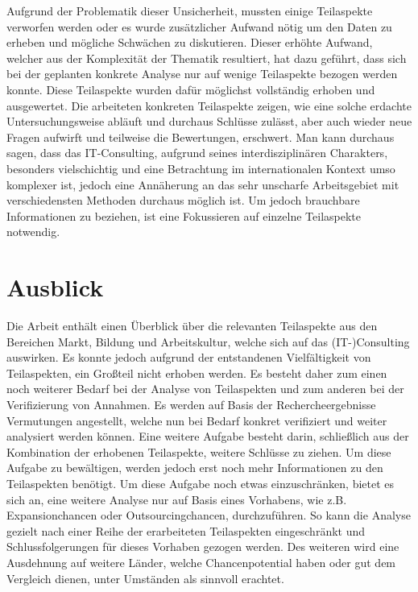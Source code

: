 Aufgrund der Problematik dieser Unsicherheit, mussten einige Teilaspekte verworfen werden oder es wurde zusätzlicher Aufwand nötig um den Daten zu erheben und mögliche Schwächen zu diskutieren. 
Dieser erhöhte Aufwand, welcher aus der Komplexität der Thematik resultiert, hat dazu geführt, dass sich bei der geplanten konkrete Analyse nur auf wenige Teilaspekte bezogen werden konnte. Diese Teilaspekte wurden dafür möglichst vollständig erhoben und ausgewertet. Die arbeiteten konkreten Teilaspekte zeigen, wie eine solche erdachte Untersuchungsweise abläuft und durchaus Schlüsse zulässt, aber auch wieder neue Fragen aufwirft und teilweise die Bewertungen, erschwert.
Man kann durchaus sagen, dass das IT-Consulting, aufgrund seines interdisziplinären Charakters, besonders vielschichtig und eine Betrachtung im internationalen Kontext umso komplexer ist, jedoch eine Annäherung an das sehr unscharfe Arbeitsgebiet mit verschiedensten Methoden durchaus möglich ist. Um jedoch brauchbare Informationen zu beziehen, ist eine Fokussieren auf einzelne Teilaspekte notwendig.
\section{Ausblick}
Die Arbeit enthält einen Überblick über die relevanten Teilaspekte aus den Bereichen Markt, Bildung und Arbeitskultur, welche sich auf das (IT-)Consulting auswirken.
Es konnte jedoch aufgrund der entstandenen Vielfältigkeit von Teilaspekten, ein Großteil nicht erhoben werden. Es besteht daher zum einen noch weiterer Bedarf bei der Analyse von Teilaspekten und zum anderen bei der Verifizierung von Annahmen. Es werden auf Basis der Rechercheergebnisse Vermutungen angestellt, welche nun bei Bedarf konkret verifiziert und weiter analysiert werden können.
Eine weitere Aufgabe besteht darin, schließlich aus der Kombination der erhobenen Teilaspekte, weitere Schlüsse zu ziehen. Um diese Aufgabe zu bewältigen, werden jedoch erst noch mehr Informationen zu den Teilaspekten benötigt.
Um diese Aufgabe noch etwas einzuschränken, bietet es sich an, eine weitere Analyse nur auf Basis eines Vorhabens, wie z.B. Expansionchancen oder Outsourcingchancen, durchzuführen. So kann die Analyse gezielt nach einer Reihe der erarbeiteten Teilaspekten eingeschränkt und Schlussfolgerungen für dieses Vorhaben gezogen werden.
Des weiteren wird eine Ausdehnung auf weitere Länder, welche Chancenpotential haben oder gut dem Vergleich dienen, unter Umständen als sinnvoll erachtet.